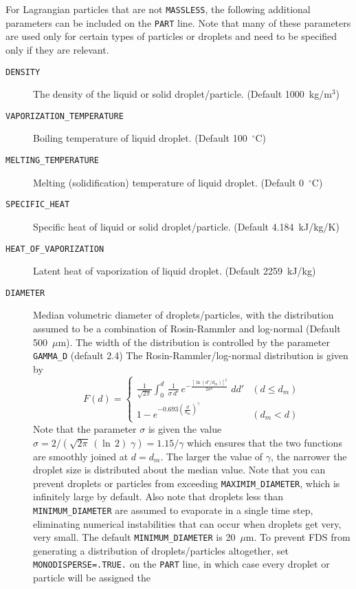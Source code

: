 \documentclass[11pt]{book}
\newcommand{\ct}{\tt\small}
\newcommand{\be}{\begin{equation}}
\newcommand{\ee}{\end{equation}}
\begin{document}
For Lagrangian particles that are not {\ct MASSLESS}, the following additional parameters can be
included on the {\ct PART} line. Note that
many of these parameters are used only for certain types of particles or
droplets and need to be specified only if they are relevant.
\begin{description}
\item[{\ct DENSITY}] The density of the liquid or solid droplet/particle.
(Default 1000~kg/m$^3$)
\item[{\ct VAPORIZATION\_TEMPERATURE}] Boiling temperature of liquid droplet.
(Default 100~$^\circ$C)
\item[{\ct MELTING\_TEMPERATURE}] Melting (solidification) temperature of liquid droplet.
(Default 0~$^\circ$C)
\item[{\ct SPECIFIC\_HEAT}] Specific heat of liquid or solid droplet/particle.
(Default 4.184~kJ/kg/K)
\item[{\ct HEAT\_OF\_VAPORIZATION}] Latent heat of vaporization of liquid droplet.
(Default 2259~kJ/kg)
\item[{\ct DIAMETER}] Median volumetric diameter of droplets/particles, with the
distribution assumed to be a combination of Rosin-Rammler and log-normal (Default 500~$\mu$m). The
width of the distribution is controlled by the parameter {\ct GAMMA\_D} (default 2.4)
The Rosin-Rammler/log-normal distribution is given by
\be F(d) = \left\{ \begin{array}{ll}
   \frac{1}{\sqrt{2\pi}} {\displaystyle \int_0^d} \, \frac{1}{\sigma\, d'} \,
   e^{-\frac{[\ln(d'/d_m)]^2}{2\sigma^2}} \; dd'       & (d \le d_m) \\
   1 - e^{-0.693 \left(\frac{d}{d_m}\right)^\gamma }  & (d_m < d)
   \end{array} \right.  \ee
Note that the parameter $\sigma$ is given the value
$\sigma=2/(\sqrt{2\pi} \, (\ln\,2) \; \gamma)=1.15/\gamma$
which ensures that the two functions are smoothly joined at $d=d_m$.
The larger the value of $\gamma$, the narrower the droplet size is
distributed about the median value. Note that you can prevent droplets or particles from
exceeding {\ct MAXIMIM\_DIAMETER}, which is infinitely large by default. Also note that
droplets less than {\ct MINIMUM\_DIAMETER} are assumed to evaporate in a single time step, eliminating numerical
instabilities that can occur when droplets get very, very small. The default {\ct MINIMUM\_DIAMETER} is 20~$\mu$m.
To prevent FDS from generating a distribution of droplets/particles altogether, set
{\ct MONODISPERSE=.TRUE.} on the {\ct PART} line, in which case every droplet or particle will be assigned the

\end{description}
\end{document}
